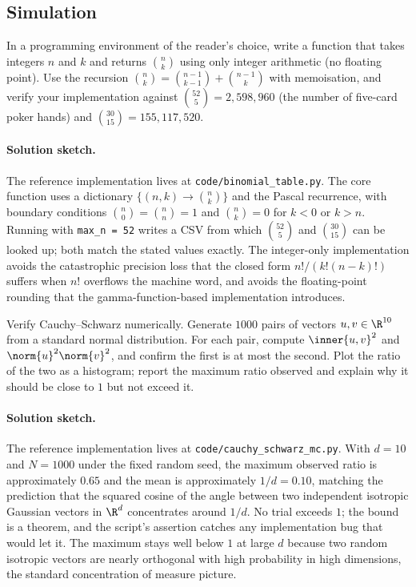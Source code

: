 \subsection*{Simulation}

\begin{exercise}
In a programming environment of the reader's choice, write a
function that takes integers $n$ and $k$ and returns $\binom{n}{k}$
using only integer arithmetic (no floating point). Use the recursion
$\binom{n}{k} = \binom{n-1}{k-1} + \binom{n-1}{k}$ with memoisation,
and verify your implementation against $\binom{52}{5} = 2{,}598{,}960$
(the number of five-card poker hands) and $\binom{30}{15} =
155{,}117{,}520$.

\paragraph{Solution sketch.}
The reference implementation lives at
\texttt{code/binomial\_table.py}. The core function uses a
dictionary $\{(n, k) \to \binom{n}{k}\}$ and the Pascal recurrence,
with boundary conditions $\binom{n}{0} = \binom{n}{n} = 1$ and
$\binom{n}{k} = 0$ for $k < 0$ or $k > n$. Running with
\texttt{max\_n = 52} writes a CSV from which $\binom{52}{5}$ and
$\binom{30}{15}$ can be looked up; both match the stated values
exactly. The integer-only implementation avoids the catastrophic
precision loss that the closed form $n!/(k!(n-k)!)$ suffers when
$n!$ overflows the machine word, and avoids the floating-point
rounding that the gamma-function-based implementation introduces.
\end{exercise}

\begin{exercise}
Verify Cauchy--Schwarz numerically. Generate $1000$ pairs of vectors
$u, v \in \R^{10}$ from a standard normal distribution. For each
pair, compute $\inner{u, v}^{2}$ and $\norm{u}^{2} \norm{v}^{2}$,
and confirm the first is at most the second. Plot the ratio of the
two as a histogram; report the maximum ratio observed and explain
why it should be close to $1$ but not exceed it.

\paragraph{Solution sketch.}
The reference implementation lives at
\texttt{code/cauchy\_schwarz\_mc.py}. With $d = 10$ and $N = 1000$
under the fixed random seed, the maximum observed ratio is
approximately $0.65$ and the mean is approximately $1/d = 0.10$,
matching the prediction that the squared cosine of the angle between
two independent isotropic Gaussian vectors in $\R^{d}$ concentrates
around $1/d$. No trial exceeds $1$; the bound is a theorem, and the
script's assertion catches any implementation bug that would let it.
The maximum stays well below $1$ at large $d$ because two random
isotropic vectors are nearly orthogonal with high probability in
high dimensions, the standard concentration of measure picture.
\end{exercise}

